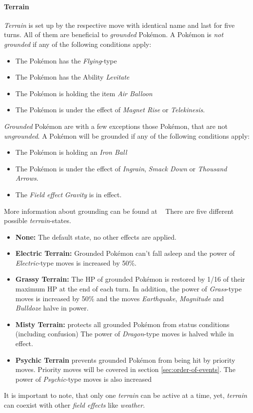 \paragraph{Terrain}
\textit{Terrain} is set up by the respective move with identical name and last for five turns. 
All of them are beneficial to \textit{grounded} Pokémon. A Pokémon is \textit{not grounded} if any of the 
following conditions apply:
\begin{itemize}
	\item The Pokémon has the \textit{Flying}-type
	\item The Pokémon has the Ability \textit{Levitate}
	\item The Pokémon is holding the item \textit{Air Balloon}
	\item The Pokémon is under the effect of \textit{Magnet Rise} or \textit{Telekinesis}.
\end{itemize}
\textit{Grounded} Pokémon are with a few exceptions those Pokémon, that are not \textit{ungrounded}. A 
Pokémon will be grounded if any of the following conditions apply:
\begin{itemize}
	\item The Pokémon is holding an \textit{Iron Ball}
	\item The Pokémon is under the effect of \textit{Ingrain}, \textit{Smack Down} or \textit{Thousand Arrows}.
	\item The \textit{Field effect} \textit{Gravity} is in effect.
\end{itemize}
More information about grounding can be found at ~\autocite{Bulbapedia:Grounded}
There are five different possible \textit{terrain}-states. 
\begin{itemize}
	\item \textbf{None:} The default state, no other effects are applied. 
	\item \textbf{Electric Terrain:} Grounded Pokémon can't fall asleep and the power of \textit{Electric}-type
		moves is increased by 50\%.
	\item \textbf{Grassy Terrain:} The HP of grounded Pokémon is restored by 1/16 of their maximum HP at the
		end of each turn. In addition, the power of \textit{Grass}-type moves is increased by 50\% and the 
		moves \textit{Earthquake}, \textit{Magnitude} and \textit{Bulldoze} halve in power. 
	\item \textbf{Misty Terrain:} protects all grounded Pokémon from status conditions (including confusion)
		The power of \textit{Dragon}-type moves is halved while in effect. 
	\item \textbf{Psychic Terrain} prevents grounded Pokémon from being hit by priority moves. Priority
	moves will be covered in section \ref{sec:order-of-events}. The power of \textit{Psychic}-type moves is also increased
\end{itemize}
It is important to note, that only one \textit{terrain} can be active at a time, yet, \textit{terrain}
can coexist with other \textit{field effects} like \textit{weather}.

